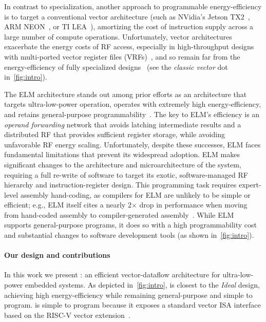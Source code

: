 In contrast to specialization, another approach to programmable
energy-efficiency is to target a conventional vector architecture (such as
NVidia's Jetson TX2~\cite{jetsontx2}, ARM NEON~\cite{neon}, or TI LEA~\cite{lea}), amortizing the cost of instruction
supply across a large number of compute operations. Unfortunately,
vector architectures exacerbate the energy costs of RF access,
especially in high-throughput designs with multi-ported vector register files (VRFs)~\cite{kozyrakis2003overcoming,asanovic1996t0,iram},
and so remain far from the energy-efficiency of fully specialized designs~\cite{hameed2010understanding} (see the \textit{classic vector} dot in~\autoref{fig:intro}).

The ELM architecture stands out among prior efforts as an architecture that
targets ultra-low-power operation, operates with extremely high
energy-efficiency, and retains general-purpose
programmability~\cite{balfour_elm_thesis,balfour2008energy}.
%
The key to ELM's efficiency is an \emph{operand forwarding} network that avoids
latching intermediate results and a distributed RF that provides
sufficient register storage, while avoiding unfavorable RF energy scaling. 
%
Unfortunately, despite these successes, ELM faces fundamental limitations that prevent its
widespread adoption.
%
ELM makes significant changes to the architecture and microarchitecture of the
system, requiring a full re-write of software to target its exotic,
software-managed RF hierarchy and instruction-register design.  This programming task
requires expert-level assembly hand-coding,
as compilers for ELM are unlikely to be simple or efficient;
e.g., ELM itself cites a nearly 2$\times$ drop in performance when moving from hand-coded assembly to compiler-generated assembly~\cite{balfour2008energy}.
%
While ELM supports general-purpose programs, it does so with a high
programmability cost and substantial changes to software development tools (as shown in~\autoref{fig:intro}).

\paragraph{Our design and contributions}
In this work we present \manic: an efficient vector-dataflow
architecture for ultra-low-power embedded systems.  
%
As depicted in~\autoref{fig:intro}, \manic is closest to the \textit{Ideal} design, achieving high energy-efficiency while remaining general-purpose and simple to program.
%
%
\manic is simple to program because it exposes a standard vector ISA interface
based on the RISC-V vector extension~\cite{riscv_2019}.

